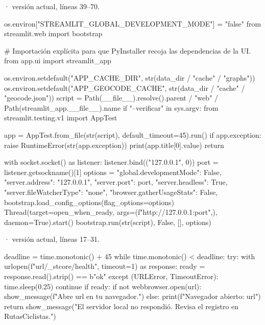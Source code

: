 \documentclass[11pt,a4paper]{article}
\begin{document}
\smallskip
{\footnotesize\texttt{} · versión actual, líneas 39--70.}\par
\begin{Codigo}[firstnumber=39]
    os.environ["STREAMLIT_GLOBAL_DEVELOPMENT_MODE"] = "false"
    from streamlit.web import bootstrap

    # Importación explícita para que PyInstaller recoja las dependencias de la UI.
    from app.ui import streamlit_app

    os.environ.setdefault("APP_CACHE_DIR", str(data_dir / "cache" / "graphs"))
    os.environ.setdefault("APP_GEOCODE_CACHE", str(data_dir / "cache" / "geocode.json"))
    script = Path(__file__).resolve().parent / "web" / Path(streamlit_app.__file__).name
    if "--verificar" in sys.argv:
        from streamlit.testing.v1 import AppTest

        app = AppTest.from_file(str(script), default_timeout=45).run()
        if app.exception:
            raise RuntimeError(str(app.exception))
        print(app.title[0].value)
        return

    with socket.socket() as listener:
        listener.bind(("127.0.0.1", 0))
        port = listener.getsockname()[1]
    options = {
        "global.developmentMode": False,
        "server.address": "127.0.0.1",
        "server.port": port,
        "server.headless": True,
        "server.fileWatcherType": "none",
        "browser.gatherUsageStats": False,
    }
    bootstrap.load_config_options(flag_options=options)
    Thread(target=open_when_ready, args=(f"http://127.0.0.1:{port}",), daemon=True).start()
    bootstrap.run(str(script), False, [], options)
\end{Codigo}

\smallskip
{\footnotesize\texttt{} · versión actual, líneas 17--31.}\par
\begin{Codigo}[firstnumber=17]
    deadline = time.monotonic() + 45
    while time.monotonic() < deadline:
        try:
            with urlopen(f"{url}/_stcore/health", timeout=1) as response:
                ready = response.read().strip() == b"ok"
        except (URLError, TimeoutError):
            time.sleep(0.25)
            continue
        if ready:
            if not webbrowser.open(url):
                show_message(f"Abre {url} en tu navegador.")
            else:
                print(f"Navegador abierto: {url}")
            return
    show_message("El servidor local no respondió. Revisa el registro en RutasCiclistas.")
\end{Codigo}
\end{document}

